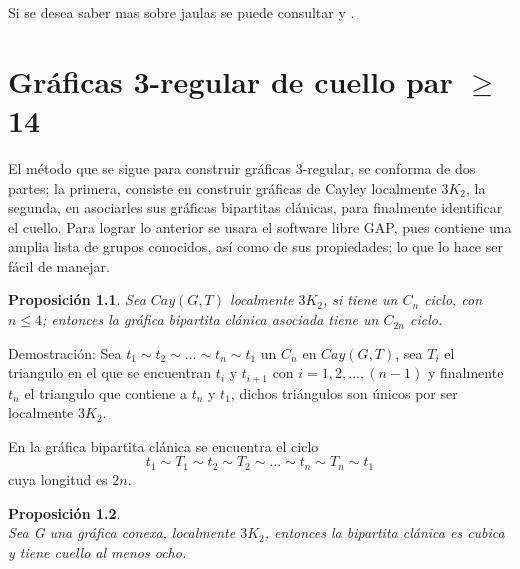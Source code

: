 \documentclass[12pt]{book}
\newtheorem{proposition}{Proposición}
\theoremstyle{definition}
\begin{document}
Si se desea saber mas sobre jaulas se puede consultar
\cite{cgcuellogrande} y \cite{ASurvey}.

\chapter{Gráficas 3-regular de cuello par $\geq$ 14}

El método que se sigue para construir gráficas 3-regular, se conforma
de dos partes; la primera, consiste en construir gráficas de Cayley
localmente $3K_2$, la segunda, en asociarles sus gráficas bipartitas
clánicas, para finalmente identificar el cuello. Para lograr lo
anterior se usara el software libre GAP, pues contiene una amplia
lista de grupos conocidos, así como de sus propiedades; lo que lo hace
ser fácil de manejar.

\begin{proposition}\label{2nciclo}
  Sea $Cay(G,T)$ localmente $3K_2$, si tiene un $C_n$ ciclo, con $n\le
  4$; entonces la gráfica bipartita clánica asociada tiene un $C_{2n}$
  ciclo.
\end{proposition}

Demostración: Sea $t_1\sim t_2\sim ... \sim t_n \sim t_1$ un $C_n$ en
$Cay(G,T)$, sea $T_i$ el triangulo en el que se encuentran $t_i$ y
$t_{i+1}$ con $i=1,2,...,(n-1)$ y finalmente $t_n$ el triangulo que
contiene a $t_n$ y $t_1$, dichos triángulos son únicos por ser
localmente $3K_2$.

En la gráfica bipartita clánica se encuentra el ciclo
$$t_1\sim T_1\sim t_2 \sim T_2 \sim ... \sim t_n \sim T_n \sim t_1$$
cuya longitud es $2n$.


\begin{proposition}\textbf{}\\
  Sea G una gráfica conexa, localmente $3K_2$, entonces la bipartita
  clánica es cubica y tiene cuello al menos ocho.\label{cuello8omas}
\end{proposition}
\end{document}
